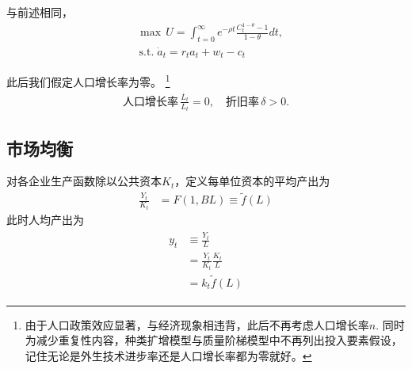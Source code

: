 \documentclass[cn,normal,11pt,black]{elegantnote}
\begin{document}
\begin{definition}[个人效用函数]
    与前述相同，
    \begin{align}
        & \max \, U  = \int_{t=0}^{\infty} e^{-\rho t} \frac{C_t^{1-\theta} -1}{1-\theta} dt, \\
        & \, \mathrm{s.t.} \; \dot{a}_t =  r_t a_t + w_t - c_t
    \end{align}
\end{definition}

\begin{definition}[投入要素]
    此后我们假定人口增长率为零。
    \footnote{由于人口政策效应显著，与经济现象相违背，此后不再考虑人口增长率$n$.
    同时为减少重复性内容，种类扩增模型与质量阶梯模型中不再列出投入要素假设，记住无论是外生技术进步率还是人口增长率都为零就好。}
    \begin{align}
        \mbox{人口增长率} \, \frac{\dot{L_t}}{L_t} = 0, \quad
        \mbox{折旧率} \, \delta > 0.
    \end{align}
\end{definition}

\subsection{市场均衡}

    对各企业生产函数除以公共资本$K_t$，定义每单位资本的平均产出为
    \begin{align}
        \frac{Y_{t}}{K_{t}} & = F(1, BL) \equiv \tilde f(L)
    \end{align}
    此时人均产出为
    \begin{align}
    \begin{aligned}
        y_t & \equiv \frac{Y_t}{L} \\
            & = \frac{Y_t}{K_t} \frac{K_t}{L} \\
            & = k_t \tilde f(L)
    \end{aligned}
    \end{align}
\end{document}
